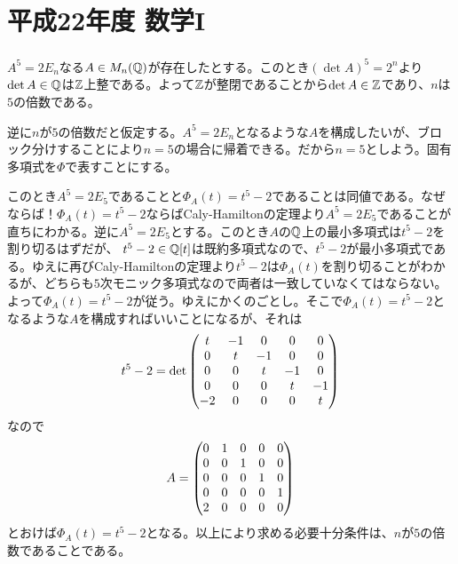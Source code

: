 \section{平成22年度 数学I}

\subsubsection{}%
\begin{sol}
  $A^5 = 2E_n$なる$A \in M_n({\mathbb Q})$が存在したとする。このとき$(\det A)^5 = 2^n$より$\det A \in {\mathbb Q}$は${\mathbb Z}$上整である。よって${\mathbb Z}$が整閉であることから$\det A \in {\mathbb Z}$であり、$n$は$5$の倍数である。

  逆に$n$が$5$の倍数だと仮定する。$A^5 = 2E_n$となるような$A$を構成したいが、ブロック分けすることにより$n=5$の場合に帰着できる。だから$n=5$としよう。固有多項式を$\Phi$で表すことにする。

  このとき$A^5 = 2E_5$であることと$\Phi_A(t) = t^5 -2$であることは同値である。なぜならば！$\Phi_A(t) = t^5 -2$ならばCaly-Hamiltonの定理より$A^5 = 2E_5$であることが直ちにわかる。逆に$A^5 = 2E_5$とする。このとき$A$の${\mathbb Q}$上の最小多項式は$t^5 -2$を割り切るはずだが、
  $t^5 -2 \in {\mathbb Q}[t]$は既約多項式なので、$t^5 -2$が最小多項式である。ゆえに再びCaly-Hamiltonの定理より$t^5 - 2$は$\Phi_A(t)$を割り切ることがわかるが、どちらも$5$次モニック多項式なので両者は一致していなくてはならない。よって$\Phi_A(t)=t^5 -2$が従う。ゆえにかくのごとし。そこで$\Phi_A(t) = t^5 -2$となるような$A$を構成すればいいことになるが、それは
  \[
  t^5 - 2 = \det \begin{pmatrix}  t& -1& 0& 0& 0 \\ 0& t& -1& 0& 0 \\ 0& 0& t& -1& 0  \\ 0& 0& 0& t& -1 \\ -2 &0& 0& 0& t \end{pmatrix}
  \]
  なので
  \[
  A =  \begin{pmatrix}  0& 1& 0& 0& 0 \\ 0& 0& 1& 0& 0 \\ 0& 0& 0& 1& 0  \\ 0& 0& 0& 0& 1 \\ 2 &0& 0& 0& 0 \end{pmatrix}
  \]
  とおけば$\Phi_A(t)=t^5 - 2$となる。以上により求める必要十分条件は、$n$が$5$の倍数であることである。
\end{sol}

\newpage

